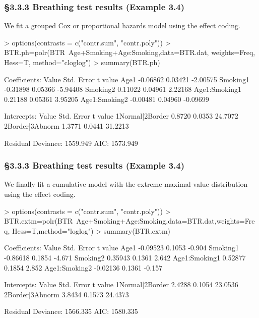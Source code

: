 \documentclass{beamer}
\begin{document}
\begin{frame}[fragile] \frametitle{\S3.3.3 Breathing test results  (Example 3.4)}
We fit a grouped Cox or proportional hazards model using the effect coding.
\begin{scriptsize}
\begin{Schunk}
\begin{Sinput}
> options(contrasts = c("contr.sum", "contr.poly"))
> BTR.ph=polr(BTR~Age+Smoking+Age:Smoking,data=BTR.dat, weights=Freq, 
                           Hess=T, method="cloglog")
> summary(BTR.ph)
\end{Sinput} 
\begin{Soutput}
Coefficients:
                 Value Std. Error  t value
Age1          -0.06862    0.03421 -2.00575
Smoking1      -0.31898    0.05366 -5.94408
Smoking2       0.11022    0.04961  2.22168
Age1:Smoking1  0.21188    0.05361  3.95205
Age1:Smoking2 -0.00481    0.04960 -0.09699

Intercepts:
                Value   Std. Error t value
1Normal|2Border  0.8720  0.0353    24.7072
2Border|3Abnorm  1.3771  0.0441    31.2213

Residual Deviance: 1559.949 
AIC: 1573.949 
\end{Soutput}
\end{Schunk}
\end{scriptsize}
\end{frame}


\begin{frame}[fragile] \frametitle{\S3.3.3 Breathing test results  (Example 3.4)}
We finally fit a cumulative model with the extreme maximal-value distribution using the effect coding.
\begin{scriptsize}
\begin{Schunk}
\begin{Sinput}
> options(contrasts = c("contr.sum", "contr.poly"))
> BTR.extm=polr(BTR~Age+Smoking+Age:Smoking,data=BTR.dat,weights=Freq, 
                              Hess=T,method="loglog")
> summary(BTR.extm)
\end{Sinput} 
\begin{Soutput}
Coefficients:
                 Value Std. Error t value
Age1          -0.09523     0.1053  -0.904
Smoking1      -0.86618     0.1854  -4.671
Smoking2       0.35943     0.1361   2.642
Age1:Smoking1  0.52877     0.1854   2.852
Age1:Smoking2 -0.02136     0.1361  -0.157

Intercepts:
                Value   Std. Error t value
1Normal|2Border  2.4288  0.1054    23.0536
2Border|3Abnorm  3.8434  0.1573    24.4373

Residual Deviance: 1566.335 
AIC: 1580.335 
\end{Soutput}
\end{Schunk}
\end{scriptsize}
\end{frame}
\end{document}
